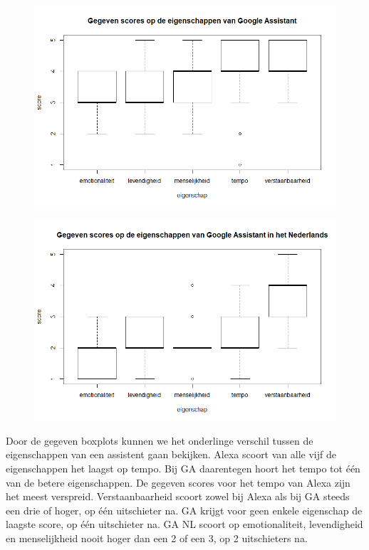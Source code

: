 \begin{figure}[h]
    \includegraphics[width=0.9\linewidth]{../onderzoek/onderzoeksresultaten/vergelijking_eigenschappen_per_assistent/boxplot_score_eigenschappen_GA}
    \caption{}
    \label{fig:boxplot-ga}
\end{figure}

\begin{figure}[h]
    \includegraphics[width=0.9\linewidth]{../onderzoek/onderzoeksresultaten/vergelijking_eigenschappen_per_assistent/boxplot_score_eigenschappen_GA_NL}
    \caption{}
    \label{fig:boxplot-ganl}
\end{figure}

Door de gegeven boxplots kunnen we het onderlinge verschil tussen de eigenschappen van een assistent gaan bekijken. Alexa scoort van alle vijf de eigenschappen het laagst op tempo. Bij GA daarentegen hoort het tempo tot één van de betere eigenschappen. De gegeven scores voor het tempo van Alexa zijn het meest verspreid. 
Verstaanbaarheid scoort zowel bij Alexa als bij GA steeds een drie of hoger, op één uitschieter na.
GA krijgt voor geen enkele eigenschap de laagste score, op één uitschieter na.
GA NL scoort op emotionaliteit, levendigheid en menselijkheid nooit hoger dan een 2 of een 3, op 2 uitschieters na.

